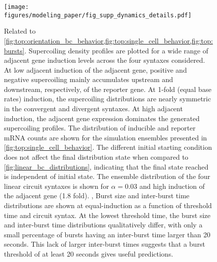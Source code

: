 \documentclass[11pt]{article} %
\begin{document}
\begin{figure}[htbp]
    \centering
    {\texttt{[image: figures/modeling\_paper/fig\_supp\_dynamics\_details.pdf]}
    \label{fig:supp:sc_density_induction}
    \label{fig:supp:fig_examples_ensemble_behavior}
    \label{fig:supp:sc_distributions_high_alpha_induction}
    \label{fig:burst_threshold_burst_size}
    \label{fig:burst_threshold_interburst_time}
    }
\end{figure}
\begin{figure}[htbp]
    \ContinuedFloat
    \caption{Related to \cref{fig:top:orientation_bc_behavior,fig:top:single_cell_behavior,fig:top:bursts}.
     Supercoiling density profiles are plotted for a wide range of adjacent gene induction levels across the four syntaxes considered. At low adjacent induction of the adjacent gene, positive and negative supercoiling mainly accumulates upstream and downstream, respectively, of the reporter gene. At 1-fold (equal base rates) induction, the supercoiling distributions are nearly symmetric in the convergent and divergent syntaxes. At high adjacent induction, the adjacent gene expression dominates the generated supercoiling profiles.
     The distribution of inducible and reporter mRNA counts are shown for the simulation ensembles presented in \cref{fig:top:single_cell_behavior}. The different initial starting condition does not affect the final distribution state when compared to \cref{fig:linear_bc_distributions}, indicating that the final state reached is independent of initial state.
    The ensemble distribution of the four linear circuit syntaxes is shown for \(\alpha = 0.03\) and high induction of the adjacent gene (1.8 fold).
    , Burst size and inter-burst time distributions are shown at equal-induction as a function of threshold time and circuit syntax. At the lowest threshold time, the burst size and inter-burst time distributions qualitatively differ, with only a small percentage of bursts having an inter-burst time larger than 20 seconds. This lack of larger inter-burst times suggests that a burst threshold of at least 20 seconds gives useful predictions.
    }
\end{figure}
\end{document}
